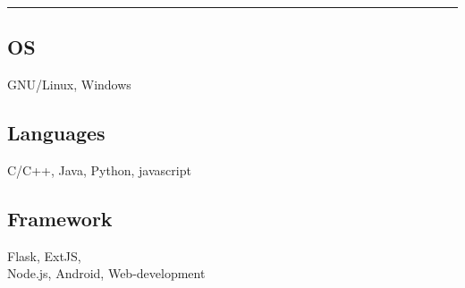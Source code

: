 
\noindent\rule{5cm}{0.4pt}
\vspace{0.2cm}

\subsection{OS}
GNU/Linux, Windows
\vspace{6pt}

\subsection{Languages}
C/C++, Java, Python, javascript
\vspace{6pt}

\subsection{Framework}
Flask, ExtJS, \\Node.js, Android,
Web-development
\vspace{6pt}

%
\sectionsep